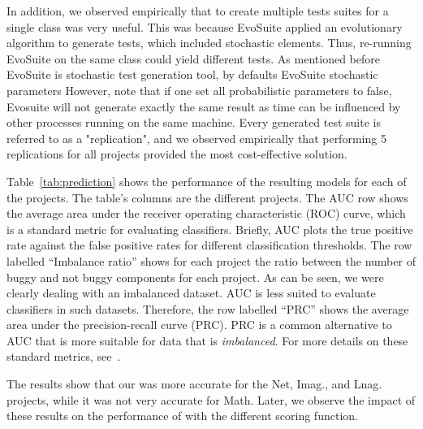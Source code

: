 \begin{}
In
addition, we observed empirically that to create multiple tests suites for a
single class was very useful. This was because EvoSuite applied an evolutionary algorithm to generate tests, which included stochastic elements. Thus, re-running EvoSuite on the same class could yield different tests. %
As mentioned before EvoSuite is stochastic test generation tool, by defaults EvoSuite stochastic parameters
However, note that if one set all probabilistic parameters to false,  Evosuite will not generate exactly the same result as time can be influenced by other processes running on the same machine.
Every generated test suite is referred to as a
"replication", and we observed empirically that performing 5
replications for all projects provided the most cost-effective solution.











Table~\ref{tab:prediction} shows the performance of the resulting \fp
models for each of the projects. 
The table's columns are the different projects. 
The AUC row shows the average area under the receiver operating characteristic (ROC) curve,
which is a standard metric for evaluating classifiers. Briefly, AUC plots the true positive rate against the false positive rates for different classification thresholds.
The row labelled ``Imbalance
ratio'' shows for each project the ratio between
the number of buggy and not buggy components for each project.
As can be seen, we were clearly dealing with an imbalanced dataset. 
AUC is less suited to evaluate classifiers in such datasets. Therefore, the row labelled ``PRC'' shows the average area under the  precision-recall curve (PRC). PRC is a common alternative to AUC that is more 
suitable for data that is \emph{imbalanced}. For more details on these standard metrics, see~\cite{davis2006relationship}. 

The results show that our \fp was more accurate for the Net, Imag., and Lnag. projects, while it was not very accurate for Math. Later, we observe the impact of these results on the performance of \quadrant with the different scoring function.


\end{}
